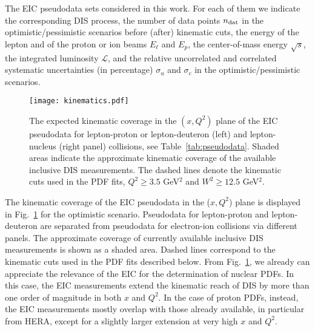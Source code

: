 \documentclass[11pt,a4paper]{article}
\begin{document}
\begin{table}[!t]
  \footnotesize
  \centering
  
  \vspace{0.3cm}
  \caption{The EIC pseudodata sets considered in this work. For each of them we
    indicate the corresponding DIS process, the number of data points
    $n_{\rm dat}$ in the optimistic/pessimistic scenarios before (after)
    kinematic cuts, the energy of the lepton and of the proton or ion beams
    $E_\ell$ and $E_p$, the center-of-mass energy $\sqrt{s}$, the integrated
    luminosity $\mathcal{L}$, and the relative uncorrelated and correlated
    systematic uncertainties (in percentage) $\sigma_u$ and $\sigma_c$
    in the optimistic/pessimistic scenarios.}
  \label{tab:pseudodata}
\end{table}

\begin{figure}[!t]
 \centering
 \texttt{[image: kinematics.pdf]}
 \caption{The expected kinematic coverage in the $(x,Q^2)$ plane of the EIC
   pseudodata for lepton-proton or lepton-deuteron (left) and lepton-nucleus
   (right panel) collisions, see Table~\ref{tab:pseudodata}. Shaded areas
   indicate the approximate kinematic coverage of the available inclusive DIS
   measurements. The dashed lines denote the kinematic cuts used in the PDF
   fits, $Q^2 \ge 3.5$ GeV$^2$ and $W^2 \ge 12.5$ GeV$^2$.}
 \label{fig:kinematics}
\end{figure}

The kinematic coverage of the EIC pseudodata in the ($x,Q^2$) plane is displayed
in Fig.~\ref{fig:kinematics} for the optimistic scenario. Pseudodata for
lepton-proton and lepton-deuteron are separated from pseudodata for electron-ion
collisions via different panels. The approximate coverage of currently available
inclusive DIS measurements is shown as a shaded area. Dashed lines correspond
to the kinematic cuts used in the PDF fits described below. From
Fig.~\ref{fig:kinematics}, we already can appreciate the relevance of the EIC
for the determination of nuclear PDFs. In this case, the EIC measurements extend
the kinematic reach of DIS by more than one order of magnitude in both $x$ and
$Q^2$. In the case of proton PDFs, instead, the EIC measurements mostly
overlap with those already available, in particular from HERA, except for a
slightly larger extension at very high $x$ and $Q^2$.
\end{document}
